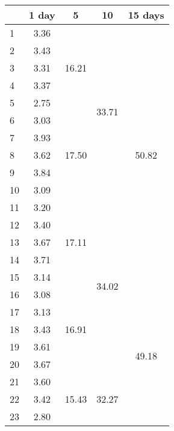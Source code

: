 \begin{center}
\begin{tabular}{| l || c | c | c | c |}\hline
 & 1 day & 5 & 10 & 15 days \\\hline
1 & \multirow{1}{*}{ 3.36 }  & \multirow{5}{*}{ 16.21 }  & \multirow{10}{*}{ 33.71 }  & \multirow{15}{*}{ 50.82 }  \\\cline{2-2}
2 & \multirow{1}{*}{ 3.43 }  & & & \\\cline{2-2}
3 & \multirow{1}{*}{ 3.31 }  & & & \\\cline{2-2}
4 & \multirow{1}{*}{ 3.37 }  & & & \\\cline{2-2}
5 & \multirow{1}{*}{ 2.75 }  & & & \\\cline{2-2}\cline{3-3}
6 & \multirow{1}{*}{ 3.03 }  & \multirow{5}{*}{ 17.50 }  & & \\\cline{2-2}
7 & \multirow{1}{*}{ 3.93 }  & & & \\\cline{2-2}
8 & \multirow{1}{*}{ 3.62 }  & & & \\\cline{2-2}
9 & \multirow{1}{*}{ 3.84 }  & & & \\\cline{2-2}
10 & \multirow{1}{*}{ 3.09 }  & & & \\\cline{2-2}\cline{3-3}\cline{4-4}
11 & \multirow{1}{*}{ 3.20 }  & \multirow{5}{*}{ 17.11 }  & \multirow{10}{*}{ 34.02 }  & \\\cline{2-2}
12 & \multirow{1}{*}{ 3.40 }  & & & \\\cline{2-2}
13 & \multirow{1}{*}{ 3.67 }  & & & \\\cline{2-2}
14 & \multirow{1}{*}{ 3.71 }  & & & \\\cline{2-2}
15 & \multirow{1}{*}{ 3.14 }  & & & \\\cline{2-2}\cline{3-3}\cline{5-5}
16 & \multirow{1}{*}{ 3.08 }  & \multirow{5}{*}{ 16.91 }  & & \multirow{15}{*}{ 49.18 }  \\\cline{2-2}
17 & \multirow{1}{*}{ 3.13 }  & & & \\\cline{2-2}
18 & \multirow{1}{*}{ 3.43 }  & & & \\\cline{2-2}
19 & \multirow{1}{*}{ 3.61 }  & & & \\\cline{2-2}
20 & \multirow{1}{*}{ 3.67 }  & & & \\\cline{2-2}\cline{3-3}\cline{4-4}
21 & \multirow{1}{*}{ 3.60 }  & \multirow{5}{*}{ 15.43 }  & \multirow{10}{*}{ 32.27 }  & \\\cline{2-2}
22 & \multirow{1}{*}{ 3.42 }  & & & \\\cline{2-2}
23 & \multirow{1}{*}{ 2.80 }  & & & \\\cline{2-2}

\end{tabular}
\end{center}
